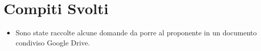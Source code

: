 \documentclass[../verbale-2016-12-17.tex]{subfiles}
\begin{document}
	\section{Compiti Svolti}
	\begin{itemize}
		\item Sono state raccolte alcune domande da porre al proponente in un documento condiviso Google Drive.
	\end{itemize}
\end{document}
